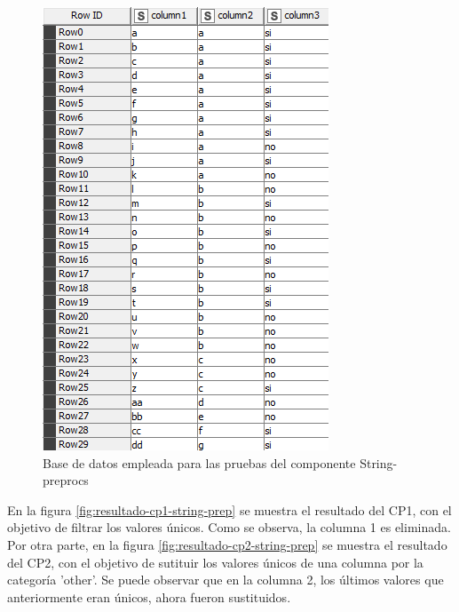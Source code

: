 \begin{figure}[H]
	\centering
	\includegraphics[width=0.3\linewidth]{"figuras/capi 3/pruebas-jenn/bd-string-preprocs"}
	\caption{Base de datos empleada para las pruebas del componente String-preprocs}
	\label{fig:bd-string-preprocs}
\end{figure}

En la figura \ref{fig:resultado-cp1-string-prep} se muestra el resultado del CP1, con el objetivo de filtrar los valores únicos. Como se observa, la columna 1 es eliminada. Por otra parte, en la figura \ref{fig:resultado-cp2-string-prep} se muestra el resultado del CP2, con el objetivo de sutituir los valores únicos de una columna por la categoría 'other'. Se puede observar que en la columna 2, los últimos valores que anteriormente eran únicos, ahora fueron sustituidos.

